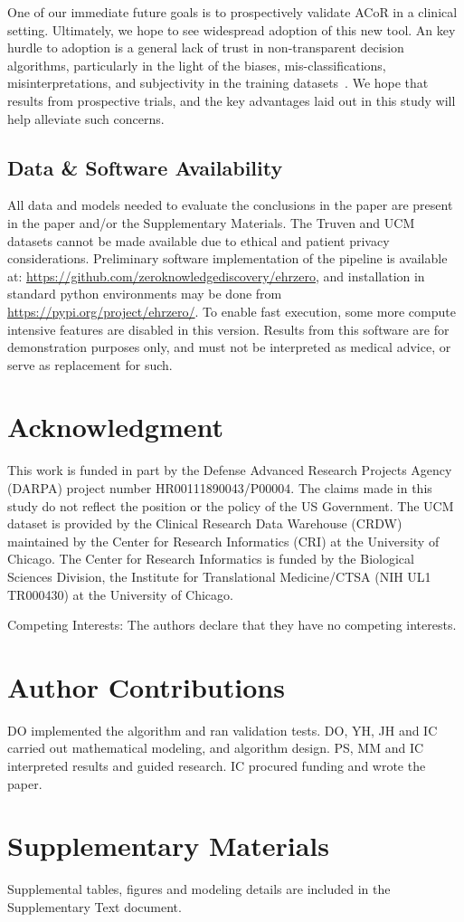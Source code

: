 \documentclass[onecolumn,10pt]{IEEEtran}
\def\acor{ACoR\xspace}
\begin{document}
One of our immediate future  goals  is to  prospectively validate \acor  in a clinical setting. Ultimately, we hope to see widespread adoption of this new tool. An key hurdle to adoption is a general lack of  trust in  non-transparent decision algorithms, particularly in the light of the biases, mis-classifications, misinterpretations, and subjectivity in the training datasets~\cite{cheng2020there}. We hope that results from prospective trials, and the key advantages laid out in this study will help alleviate such concerns.



\subsection*{Data \& Software Availability} 
All data and models needed to evaluate the conclusions in the paper are present in the paper and/or the Supplementary Materials. The Truven and UCM datasets  cannot be made available due to ethical and patient privacy considerations. Preliminary software implementation of the pipeline is available at: 
\url{https://github.com/zeroknowledgediscovery/ehrzero}, and installation in standard python environments may be done from \url{https://pypi.org/project/ehrzero/}. To enable fast execution, some more compute intensive features are disabled in this version. Results from this software are for demonstration purposes only, and must not be interpreted as medical advice, or serve as replacement for such.


\section*{Acknowledgment}
This work is funded in part by the Defense Advanced Research Projects Agency (DARPA) project number  HR00111890043/P00004. The claims made in this study  do not  reflect the position or the policy of the US Government. The UCM dataset is provided by the Clinical Research Data Warehouse (CRDW) maintained by the Center for Research Informatics (CRI) at the  University of Chicago. The Center for Research Informatics is funded by the Biological Sciences Division, the Institute for Translational Medicine/CTSA (NIH UL1 TR000430) at the University of Chicago. 

Competing Interests: The authors declare that they have no competing interests.

\section*{Author Contributions}
DO implemented the algorithm and ran validation tests. DO, YH, JH and IC carried out mathematical modeling, and  algorithm design. PS, MM and IC interpreted results and guided research.
IC procured funding and  wrote the paper.

\section*{Supplementary Materials} Supplemental tables, figures and modeling details are included in the Supplementary Text document.


\nocite{*}

\end{document}
